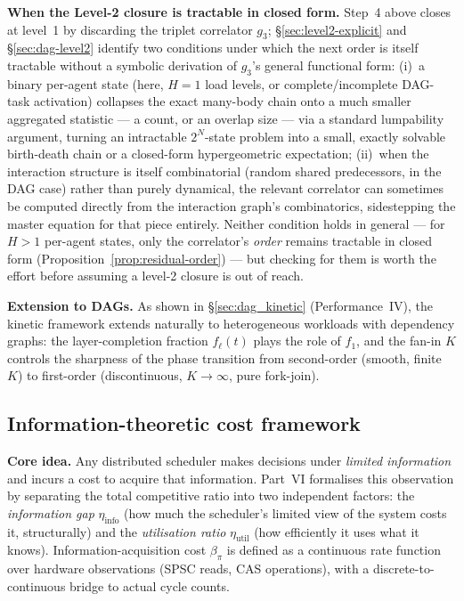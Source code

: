 \documentclass[11pt,a4paper]{report}
\begin{document}
\medskip
\noindent\textbf{When the Level-2 closure is tractable in closed form.}
Step~4 above closes at level~1 by discarding the triplet correlator
$g_3$; \S\ref{sec:level2-explicit} and \S\ref{sec:dag-level2} identify
two conditions under which the next order is itself tractable without
a symbolic derivation of $g_3$'s general functional form: (i)~a binary
per-agent state (here, $H=1$ load levels, or complete/incomplete
DAG-task activation) collapses the exact many-body chain onto a much
smaller aggregated statistic --- a count, or an overlap size --- via a
standard lumpability argument, turning an intractable $2^N$-state
problem into a small, exactly solvable birth-death chain or a
closed-form hypergeometric expectation; (ii)~when the interaction
structure is itself combinatorial (random shared predecessors, in the
DAG case) rather than purely dynamical, the relevant correlator can
sometimes be computed directly from the interaction graph's
combinatorics, sidestepping the master equation for that piece
entirely. Neither condition holds in general --- for $H>1$ per-agent
states, only the correlator's \emph{order} remains tractable in closed
form (Proposition~\ref{prop:residual-order}) --- but checking for them
is worth the effort before assuming a level-2 closure is out of reach.

\medskip
\noindent\textbf{Extension to DAGs.}
As shown in \S\ref{sec:dag_kinetic} (Performance~IV), the kinetic framework
extends naturally to heterogeneous workloads with dependency graphs:
the layer-completion fraction $f_\ell(t)$ plays the role of $f_1$, and
the fan-in $K$ controls the sharpness of the phase transition from
second-order (smooth, finite $K$) to first-order (discontinuous,
$K \to \infty$, pure fork-join).

\subsection{Information-theoretic cost framework}

\medskip
\noindent\textbf{Core idea.}
Any distributed scheduler makes decisions under \emph{limited information}
and incurs a cost to acquire that information.  Part~VI formalises this
observation by separating the total competitive ratio into two independent
factors: the \emph{information gap} $\eta_{\mathrm{info}}$ (how much the
scheduler's limited view of the system costs it, structurally) and the
\emph{utilisation ratio} $\eta_{\mathrm{util}}$ (how efficiently it uses
what it knows).  Information-acquisition cost $\beta_\pi$ is defined as a
continuous rate function over hardware observations (SPSC reads, CAS
operations), with a discrete-to-continuous bridge to actual cycle counts.
\end{document}
